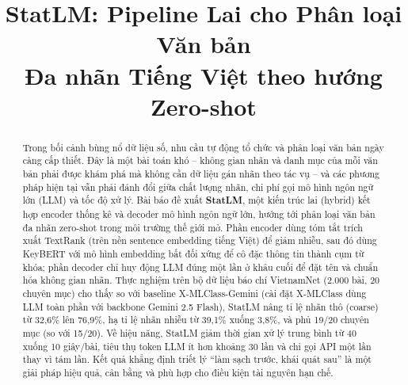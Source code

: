 \documentclass[conference]{IEEEtran}
\begin{document}
\title{StatLM: Pipeline Lai cho Phân loại Văn bản\\
Đa nhãn Tiếng Việt theo hướng Zero-shot}

\author{
\and
{}
}

\maketitle

\begin{abstract}
Trong bối cảnh bùng nổ dữ liệu số, nhu cầu tự động tổ chức và phân loại văn bản
ngày càng cấp thiết. Đây là một bài toán khó -- không gian nhãn và danh mục của
mỗi văn bản phải được khám phá mà không cần dữ liệu gán nhãn theo tác vụ -- và
các phương pháp hiện tại vẫn phải đánh đổi giữa chất lượng nhãn, chi phí gọi mô
hình ngôn ngữ lớn (LLM) và tốc độ xử lý. Bài báo đề xuất \textbf{StatLM}, một
kiến trúc lai (hybrid) kết hợp encoder thống kê và decoder mô hình ngôn ngữ lớn,
hướng tới phân loại văn bản đa nhãn zero-shot trong môi trường thế giới mở. Phần encoder dùng tóm tắt trích xuất TextRank
(trên nền sentence embedding tiếng Việt) để giảm nhiễu, sau đó dùng KeyBERT với
mô hình embedding bất đối xứng để cô đặc thông tin thành cụm từ khóa; phần
decoder chỉ huy động LLM đúng một lần ở khâu cuối để đặt tên và chuẩn hóa không
gian nhãn. Thực nghiệm trên bộ dữ liệu báo chí VietnamNet (2.000 bài, 20 chuyên
mục) cho thấy so với baseline X-MLClass-Gemini (cài đặt X-MLClass dùng LLM toàn
phần với backbone Gemini 2.5 Flash), StatLM nâng tỉ lệ nhãn thô (coarse) từ 32,6\% lên 76,9\%, hạ tỉ lệ nhãn
nhiễu từ 39,1\% xuống 3,8\%, và phủ 19/20 chuyên mục (so với 15/20). Về hiệu
năng, StatLM giảm thời gian xử lý trung bình từ 40 xuống 10 giây/bài, tiêu thụ
token LLM ít hơn khoảng 30 lần và chỉ gọi API một lần thay vì tám lần. Kết quả
khẳng định triết lý ``làm sạch trước, khái quát sau'' là một giải pháp hiệu quả,
cân bằng và phù hợp cho điều kiện tài nguyên hạn chế.
\end{abstract}
\end{document}
